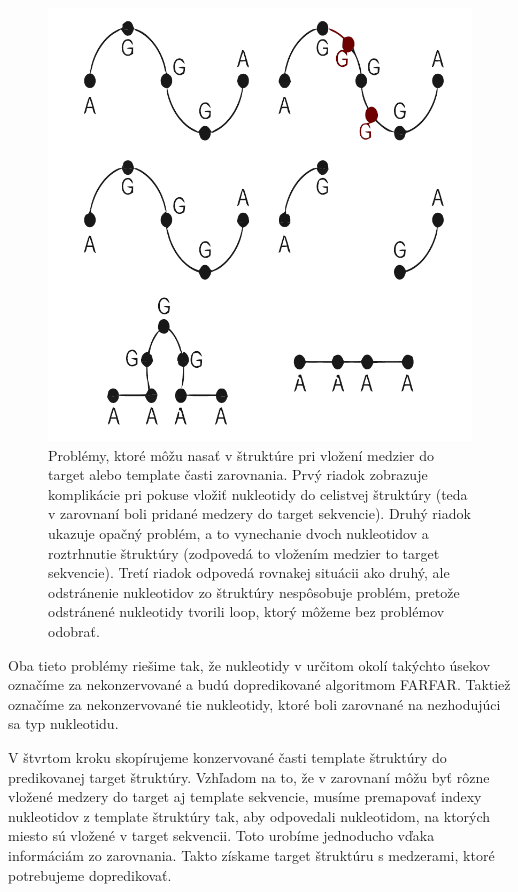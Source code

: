 \begin{figure}%
\includegraphics[width=\textwidth]{../img/aln-problems}
\caption{Problémy, ktoré môžu nasať v štruktúre pri vložení medzier do target alebo template časti zarovnania. Prvý riadok zobrazuje komplikácie pri pokuse vložiť nukleotidy do celistvej štruktúry (teda v zarovnaní boli pridané medzery do target sekvencie). Druhý riadok ukazuje opačný problém, a to vynechanie dvoch nukleotidov a roztrhnutie štruktúry (zodpovedá to vložením medzier to target sekvencie). Tretí riadok odpovedá rovnakej situácii ako druhý, ale odstránenie nukleotidov zo štruktúry nespôsobuje problém, pretože odstránené nukleotidy tvorili loop, ktorý môžeme bez problémov odobrať.}
\label{obr3.1:indels}
\end{figure}

Oba tieto problémy riešime tak, že nukleotidy v určitom okolí takýchto úsekov označíme za nekonzervované a budú dopredikované algoritmom FARFAR.
Taktiež označíme za nekonzervované tie nukleotidy, ktoré boli zarovnané na nezhodujúci sa typ nukleotidu. 


\indent V štvrtom kroku skopírujeme konzervované časti template štruktúry do predikovanej target štruktúry. Vzhľadom na to, že v zarovnaní môžu byť rôzne vložené medzery do target aj template sekvencie, musíme premapovať indexy nukleotidov z template štruktúry tak, aby odpovedali nukleotidom, na ktorých miesto sú vložené v target sekvencii. Toto urobíme jednoducho vďaka informáciám zo zarovnania. Takto získame target štruktúru s medzerami, ktoré potrebujeme dopredikovať.


